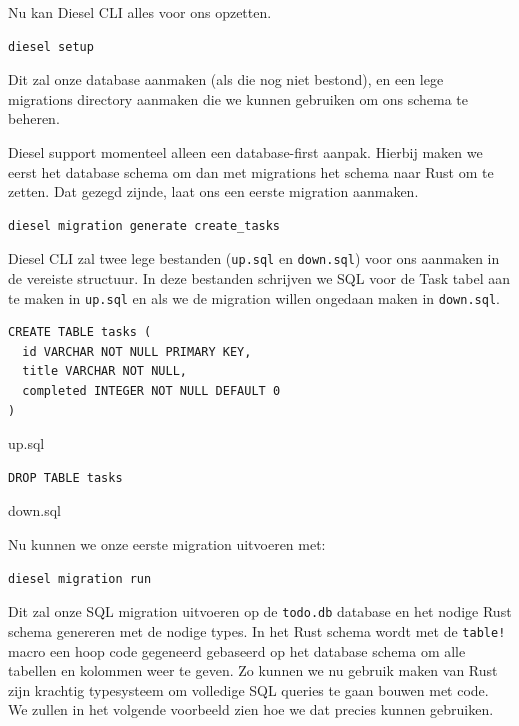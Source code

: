 Nu kan Diesel CLI alles voor ons opzetten.

\begin{verbatim}
diesel setup
\end{verbatim}

Dit zal onze database aanmaken (als die nog niet bestond), en een lege migrations directory aanmaken
die we kunnen gebruiken om ons schema te beheren.

Diesel support momenteel alleen een database-first aanpak. Hierbij maken we eerst het database
schema om dan met migrations het schema naar Rust om te zetten. Dat gezegd zijnde, laat ons een
eerste migration aanmaken.

\begin{verbatim}
diesel migration generate create_tasks
\end{verbatim}

Diesel CLI zal twee lege bestanden (\texttt{up.sql} en \texttt{down.sql}) voor
ons aanmaken in de vereiste structuur. In deze bestanden schrijven we SQL voor de Task tabel aan te
maken in \texttt{up.sql} en als we de migration willen ongedaan maken in
\texttt{down.sql}.

\begin{listing}
\begin{verbatim}
CREATE TABLE tasks (
  id VARCHAR NOT NULL PRIMARY KEY,
  title VARCHAR NOT NULL,
  completed INTEGER NOT NULL DEFAULT 0
)
\end{verbatim}
\caption{up.sql}
\end{listing}

\begin{listing}
\begin{verbatim}
DROP TABLE tasks
\end{verbatim}
\caption{down.sql}
\end{listing}

Nu kunnen we onze eerste migration uitvoeren met:

\begin{verbatim}
diesel migration run
\end{verbatim}

Dit zal onze SQL migration uitvoeren op de \texttt{todo.db} database en het nodige Rust
schema genereren met de nodige types. In het Rust schema wordt met de \texttt{table!}
macro een hoop code gegeneerd gebaseerd op het database schema om alle tabellen en kolommen weer te
geven. Zo kunnen we nu gebruik maken van Rust zijn krachtig typesysteem om volledige SQL queries te
gaan bouwen met code. We zullen in het volgende voorbeeld zien hoe we dat precies kunnen gebruiken.


